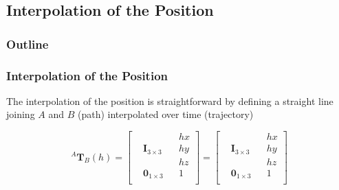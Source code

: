 \documentclass[10pt, aspectratio=169]{beamer}
\theoremstyle{remark}
\theoremstyle{definition}
\begin{document}
\subsection{Interpolation of the Position}
\begin{frame}
	\frametitle{Outline} %
\end{frame}
\begin{frame}[allowframebreaks]
\frametitle{Interpolation of the Position}

The interpolation of the position is straightforward by defining a straight line joining $A$ and $B$ (path) interpolated over time (trajectory)

$$
^A\mathbf{T}_B(h) = \left[\begin{matrix}
     &   &  & hx \\
     &  \mathbf{I}_{3 \times 3} &  & hy \\
     &   &  & hz \\
     & \mathbf{0}_{1 \times 3} &  & 1 \\
\end{matrix}\right] =
\left[\begin{matrix}
     &   &  & hx \\
     &  \mathbf{I}_{3 \times 3} &  & hy \\
     &   &  & hz \\
     & \mathbf{0}_{1 \times 3} &  & 1 \\
\end{matrix}\right]
$$

\end{frame}
\end{document}
